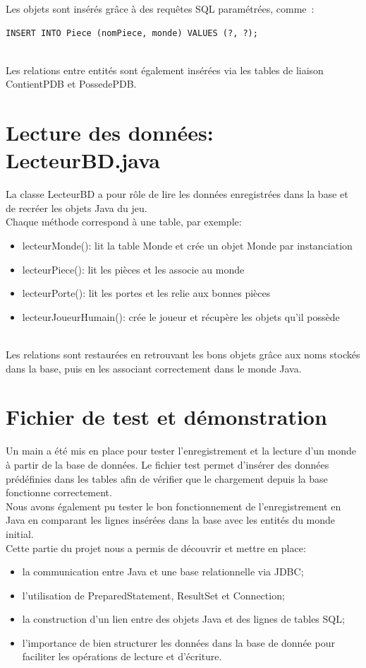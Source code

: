 Les objets sont insérés grâce à des requêtes SQL paramétrées, comme :
\begin{verbatim}
INSERT INTO Piece (nomPiece, monde) VALUES (?, ?);
\end{verbatim}\\

Les relations entre entités sont également insérées via les tables de liaison ContientPDB et PossedePDB.\\

\section{Lecture des données: LecteurBD.java}

La classe LecteurBD a pour rôle de lire les données enregistrées dans la base et de recréer les objets Java du jeu.\\
Chaque méthode correspond à une table, par exemple:
\begin{itemize}
	\item lecteurMonde(): lit la table Monde et crée un objet Monde par instanciation
	\item lecteurPiece(): lit les pièces et les associe au monde
	\item lecteurPorte(): lit les portes et les relie aux bonnes pièces
	\item lecteurJoueurHumain(): crée le joueur et récupère les objets qu’il possède
\end{itemize}\\

Les relations sont restaurées en retrouvant les bons objets grâce aux noms stockés dans la base, puis en les associant correctement dans le monde Java.\\

\section{Fichier de test et démonstration}

Un main a été mis en place pour tester l'enregistrement et la lecture d'un monde à partir de la base de données. Le fichier test permet d’insérer des données prédéfinies dans les tables afin de vérifier que le chargement depuis la base fonctionne correctement.\\

Nous avons également pu tester le bon fonctionnement de l'enregistrement en Java en comparant les lignes insérées dans la base avec les entités du monde initial.\\

Cette partie du projet nous a permis de découvrir et mettre en place:
\begin{itemize}
	\item la communication entre Java et une base relationnelle via JDBC;
	\item l’utilisation de PreparedStatement, ResultSet et Connection;
	\item la construction d’un lien entre des objets Java et des lignes de tables SQL;
	\item l’importance de bien structurer les données dans la base de donnée pour faciliter les opérations de lecture et d’écriture.
\end{itemize}
